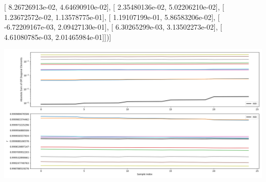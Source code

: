 \documentclass{article}
\begin{document}
       [  8.26726913e-02,   4.64690910e-02],
       [  2.35480136e-02,   5.02206210e-02],
       [  1.23672572e-02,   1.13578775e-01],
       [  1.19107199e-01,   5.86583206e-02],
       [ -6.72209167e-03,   2.09427130e-01],
       [  6.30265299e-03,   3.13502273e-02],
       [  4.61080785e-03,   2.01465984e-01]])]
\begin{center}
\includegraphics[scale=.9]{report_pickled_controls210/control_dpn_all.png}

\end{center}
\end{document}
